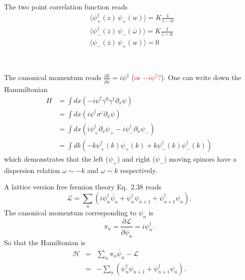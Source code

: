 \documentclass[submission, PhysLectNotes]{SciPost}
\begin{document}
The two point correlation function reads 
\begin{equation}
	\begin{aligned}
		&\langle \psi_{+}^\dagger(z) \, \psi_{+}(w) \rangle = K\frac{1}{z-w} \\
		&\langle \psi_{-}^\dagger(\overline{z}) \, \psi_{-}(\overline{\omega}) \rangle = K\frac{1}{\overline{z}-\overline{w}} \\
		&\langle \psi_{-}(\overline{z}) \, \psi_{+}(w) \rangle = 0\\
	\end{aligned}
\end{equation} \\


 \\
The canonical momentum reads $\frac{\partial L}{\partial \dot{\psi}} = i\psi^\dagger$ (\textcolor{red}{or $-i\psi^\dagger$?}). One can write down the Hammiltonian
\begin{equation}
	\begin{aligned}
		H &= \int dx \left(-i\psi^\dagger \gamma^0\gamma^1 \partial_x \psi \right) \\
		&= \int dx \left(i\psi^\dagger \sigma^z \partial_x \psi \right) \\
		&= \int dx \left( i\psi_{+}^\dagger \partial_x \psi_{+} - i\psi_{-}^\dagger \partial_x \psi_{-}  \right) \\
		&= \int dk \left( -k \psi_{+}^\dagger (k) \psi_{+}(k) + k \psi_{-}^\dagger (k)\psi_{-}^\dagger (k) \right)
	\end{aligned}
\end{equation} 
which demonstrates that the left ($\psi_{+}$) and right ($\psi_{-}$) moving spinors have a dispersion relation $\omega \sim -k$ and $\omega \sim k$ respectively.

A lattice version free fermion theory Eq.~$2.38$ reads
\begin{equation}
    \mathcal{L} = \sum_n \left( i\psi_n^\dagger \dot{\psi_n} + \psi_n^\dagger \psi_{n+1} + \psi_{n+1}^\dagger \psi_{n}\right).
\end{equation}
The canonical momentum corresponding to $\psi_n$ is
\begin{equation}
    \pi_n = \frac{\partial \mathcal{L}}{\partial \dot{\psi_n}} = i \psi_n^\dagger.
\end{equation}
So that the Hamiltonian is
\begin{eqnarray}
    \mathcal{H} &=& \sum_n \pi_n \dot{\psi_n} - \mathcal{L} \nonumber\\
      &=& - \sum_n \left(\psi_n^\dagger \psi_{n+1}  + \psi_{n+1}^\dagger \psi_{n}\right).
\end{eqnarray}
\end{document}

